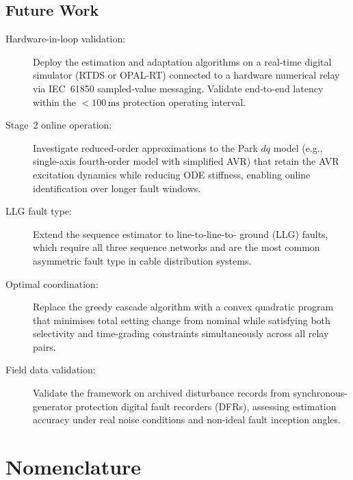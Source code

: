 \documentclass[12pt,a4paper]{article}
\theoremstyle{definition}
\theoremstyle{plain}
\newcommand{\mss}{\,\text{ms}}
\begin{document}
\subsection{Future Work}
\label{sec:conc:future}

\begin{description}
  \item[Hardware-in-loop validation:] Deploy the estimation and adaptation
        algorithms on a real-time digital simulator (RTDS or OPAL-RT)
        connected to a hardware numerical relay via IEC~61850 sampled-value
        messaging.  Validate end-to-end latency within the $<100\mss$
        protection operating interval.

  \item[Stage~2 online operation:] Investigate reduced-order approximations
        to the Park $dq$ model (e.g., single-axis fourth-order model with
        simplified AVR) that retain the AVR excitation dynamics while
        reducing ODE stiffness, enabling online identification over
        longer fault windows.

  \item[LLG fault type:] Extend the sequence estimator to line-to-line-to-
        ground (LLG) faults, which require all three sequence networks and
        are the most common asymmetric fault type in cable distribution
        systems.

  \item[Optimal coordination:] Replace the greedy cascade algorithm with
        a convex quadratic program that minimises total setting change from
        nominal while satisfying both selectivity and time-grading constraints
        simultaneously across all relay pairs.

  \item[Field data validation:] Validate the framework on archived disturbance
        records from synchronous-generator protection digital fault recorders
        (DFRs), assessing estimation accuracy under real noise conditions and
        non-ideal fault inception angles.
\end{description}

\newpage
\section*{Nomenclature}
\end{document}
